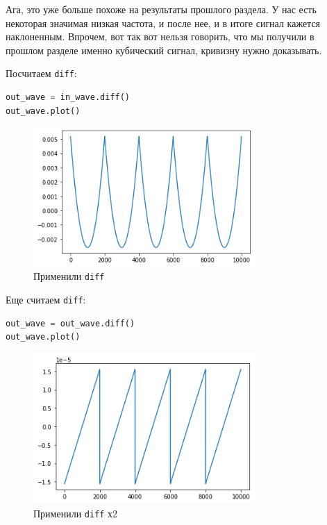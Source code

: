 \documentclass[a4paper,12pt]{report}
\begin{document}
    Ага, это уже больше похоже на результаты прошлого раздела. У нас есть некоторая значимая низкая частота, и  после нее, и в итоге сигнал кажется наклоненным. Впрочем, вот так вот  нельзя говорить, что мы получили в прошлом разделе именно кубический сигнал, кривизну нужно доказывать.

    Посчитаем \texttt{diff}:
    
\begin{lstlisting}[language=Python,caption=Применили \texttt{diff}]
out_wave = in_wave.diff()
out_wave.plot()
\end{lstlisting}

    \begin{figure}[H]
        \centering
        \includegraphics[width=0.75\textwidth]{ex4_out_wave.png}
        \caption{Применили \texttt{diff}}
        \label{fig:ex4_out_wave}
    \end{figure}

    Еще считаем \texttt{diff}:
    
\begin{lstlisting}[language=Python,caption=Применили \texttt{diff} х2]
out_wave = out_wave.diff()
out_wave.plot()
\end{lstlisting}

    \begin{figure}[H]
        \centering
        \includegraphics[width=0.75\textwidth]{ex4_out_wave_more.png}
        \caption{Применили \texttt{diff} х2}
        \label{fig:ex4_out_wave_more}
    \end{figure}
\end{document}

